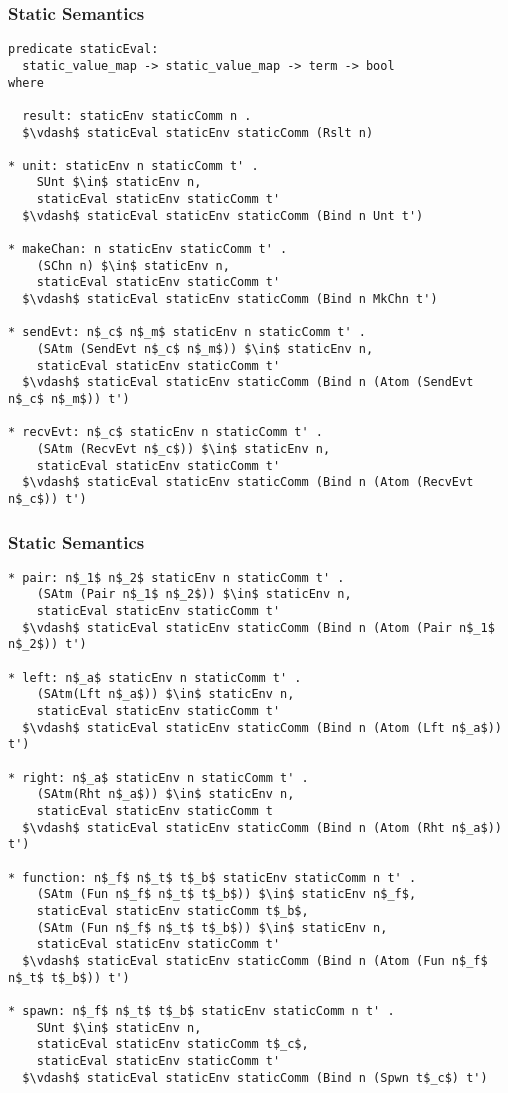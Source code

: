 \documentclass{beamer}
\begin{document}
\begin{frame}[fragile]
	\frametitle{Static Semantics}
\begin{lstlisting}[language=logic, mathescape]
predicate staticEval:
  static_value_map -> static_value_map -> term -> bool
where

  result: staticEnv staticComm n .
  $\vdash$ staticEval staticEnv staticComm (Rslt n)

* unit: staticEnv n staticComm t' .
    SUnt $\in$ staticEnv n,
    staticEval staticEnv staticComm t'
  $\vdash$ staticEval staticEnv staticComm (Bind n Unt t')

* makeChan: n staticEnv staticComm t' .
    (SChn n) $\in$ staticEnv n,
    staticEval staticEnv staticComm t'
  $\vdash$ staticEval staticEnv staticComm (Bind n MkChn t')

* sendEvt: n$_c$ n$_m$ staticEnv n staticComm t' .
    (SAtm (SendEvt n$_c$ n$_m$)) $\in$ staticEnv n,
    staticEval staticEnv staticComm t' 
  $\vdash$ staticEval staticEnv staticComm (Bind n (Atom (SendEvt n$_c$ n$_m$)) t')

* recvEvt: n$_c$ staticEnv n staticComm t' . 
    (SAtm (RecvEvt n$_c$)) $\in$ staticEnv n,
    staticEval staticEnv staticComm t'
  $\vdash$ staticEval staticEnv staticComm (Bind n (Atom (RecvEvt n$_c$)) t')
\end{lstlisting}
\end{frame}

\begin{frame}[fragile]
	\frametitle{Static Semantics}
\begin{lstlisting}[language=logic, mathescape]
* pair: n$_1$ n$_2$ staticEnv n staticComm t' .
    (SAtm (Pair n$_1$ n$_2$)) $\in$ staticEnv n,
    staticEval staticEnv staticComm t'
  $\vdash$ staticEval staticEnv staticComm (Bind n (Atom (Pair n$_1$ n$_2$)) t')

* left: n$_a$ staticEnv n staticComm t' .
    (SAtm(Lft n$_a$)) $\in$ staticEnv n,
    staticEval staticEnv staticComm t' 
  $\vdash$ staticEval staticEnv staticComm (Bind n (Atom (Lft n$_a$)) t')

* right: n$_a$ staticEnv n staticComm t' .
    (SAtm(Rht n$_a$)) $\in$ staticEnv n, 
    staticEval staticEnv staticComm t
  $\vdash$ staticEval staticEnv staticComm (Bind n (Atom (Rht n$_a$)) t')

* function: n$_f$ n$_t$ t$_b$ staticEnv staticComm n t' .
    (SAtm (Fun n$_f$ n$_t$ t$_b$)) $\in$ staticEnv n$_f$, 
    staticEval staticEnv staticComm t$_b$, 
    (SAtm (Fun n$_f$ n$_t$ t$_b$)) $\in$ staticEnv n, 
    staticEval staticEnv staticComm t'
  $\vdash$ staticEval staticEnv staticComm (Bind n (Atom (Fun n$_f$ n$_t$ t$_b$)) t')

* spawn: n$_f$ n$_t$ t$_b$ staticEnv staticComm n t' .
    SUnt $\in$ staticEnv n, 
    staticEval staticEnv staticComm t$_c$, 
    staticEval staticEnv staticComm t'
  $\vdash$ staticEval staticEnv staticComm (Bind n (Spwn t$_c$) t')
\end{lstlisting}
\end{frame}
\end{document}
